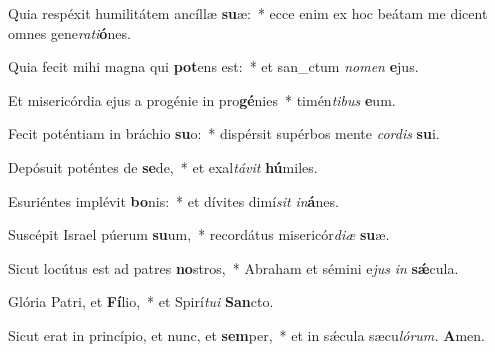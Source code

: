 \item Quia respéxit humilitátem ancíllæ \textbf{su}æ:~* ecce enim ex hoc beátam me dicent omnes gene\textit{rati}\textbf{ó}nes.
\item Quia fecit mihi magna qui \textbf{pot}ens est:~* et san\_ctum \textit{nomen} \textbf{e}jus.
\item Et misericórdia ejus a progénie in pro\textbf{gé}nies~* timén\textit{tibus} \textbf{e}um.
\item Fecit poténtiam in bráchio \textbf{su}o:~* dispérsit supérbos mente \textit{cordis} \textbf{su}i.
\item Depósuit poténtes de \textbf{se}de,~* et exal\textit{távit} \textbf{hú}miles.
\item Esuriéntes implévit \textbf{bo}nis:~* et dívites dimí\tinyhspace\textit{sit} \textit{in}\textbf{á}nes.
\item Suscépit Israel púerum \textbf{su}um,~* recordátus misericór\textit{diæ} \textbf{su}æ.
\item Sicut locútus est ad patres \textbf{no}stros,~* Abraham et sémini e\hspace{0.02em}\textit{jus} \textit{in} \textbf{sǽ}cula.
\item Glória Patri, et \textbf{Fí}lio,~* et Spirí\tinyhspace\textit{tui} \textbf{San}cto.
\item Sicut erat in princípio, et nunc, et \textbf{sem}per,~* et in sǽcula sæcu\tinyhspace\textit{lórum.} \textbf{A}men.